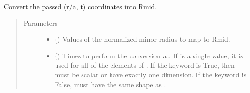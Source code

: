 \documentclass[letterpaper,10pt,english]{sphinxmanual}
\begin{document}
\begin{fulllineitems}
\begin{fulllineitems}
\begin{sphinxVerbatim}[commandchars=\\\{\}]
   \PYG{p}{[} \PYG{p}{]} \PYG{p}{[} \PYG{p}{]} 
\end{sphinxVerbatim}

\end{fulllineitems}


\begin{fulllineitems}
\label{\detokenize{eqtools:eqtools.core.Equilibrium.roa2rmid}}
Convert the passed (r/a, t) coordinates into Rmid.
\begin{quote}\begin{description}
\item[{Parameters}] \leavevmode\begin{itemize}
\item {} 
 () \textendash{} Values of the normalized minor
radius to map to Rmid.

\item {} 
 () \textendash{} Times to perform the conversion at.
If  is a single value, it is used for all of the elements of
. If the  keyword is True, then  must be scalar
or have exactly one dimension. If the  keyword is False,
 must have the same shape as .

\end{itemize}


\end{description}
\end{quote}
\end{fulllineitems}
\end{fulllineitems}
\end{document}
